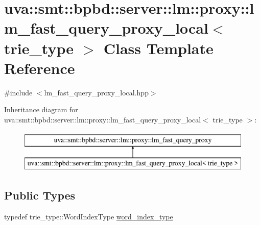 \hypertarget{classuva_1_1smt_1_1bpbd_1_1server_1_1lm_1_1proxy_1_1lm__fast__query__proxy__local}{}\section{uva\+:\+:smt\+:\+:bpbd\+:\+:server\+:\+:lm\+:\+:proxy\+:\+:lm\+\_\+fast\+\_\+query\+\_\+proxy\+\_\+local$<$ trie\+\_\+type $>$ Class Template Reference}
\label{classuva_1_1smt_1_1bpbd_1_1server_1_1lm_1_1proxy_1_1lm__fast__query__proxy__local}


{\ttfamily \#include $<$lm\+\_\+fast\+\_\+query\+\_\+proxy\+\_\+local.\+hpp$>$}

Inheritance diagram for uva\+:\+:smt\+:\+:bpbd\+:\+:server\+:\+:lm\+:\+:proxy\+:\+:lm\+\_\+fast\+\_\+query\+\_\+proxy\+\_\+local$<$ trie\+\_\+type $>$\+:\begin{figure}[H]
\begin{center}
\leavevmode
\includegraphics[height=2.000000cm]{classuva_1_1smt_1_1bpbd_1_1server_1_1lm_1_1proxy_1_1lm__fast__query__proxy__local}
\end{center}
\end{figure}
\subsection*{Public Types}
\begin{DoxyCompactItemize}
\item 
typedef trie\+\_\+type\+::\+Word\+Index\+Type \hyperlink{classuva_1_1smt_1_1bpbd_1_1server_1_1lm_1_1proxy_1_1lm__fast__query__proxy__local_a4c2aa6b7e82b20c0e66095486c020d34}{word\+\_\+index\+\_\+type}
\end{DoxyCompactItemize}
